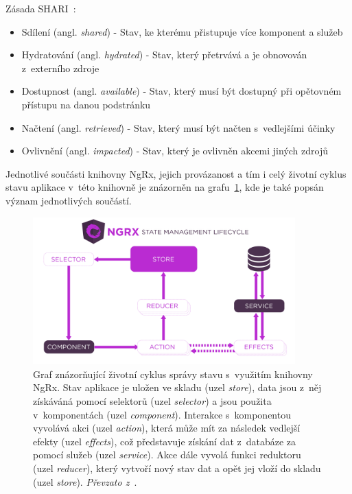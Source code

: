 Zásada SHARI~\cite{bib:ng-conf}:
\begin{itemize}
  \item Sdílení (angl. \emph{shared}) - Stav, ke kterému přistupuje více komponent a služeb
  \item Hydratování (angl. \emph{hydrated}) - Stav, který přetrvává a je obnovován z~externího zdroje
  \item Dostupnost (angl. \emph{available}) - Stav, který musí být dostupný při opětovném přístupu na danou podstránku
  \item Načtení (angl. \emph{retrieved}) - Stav, který musí být načten s~vedlejšími účinky
  \item Ovlivnění (angl. \emph{impacted}) - Stav, který je ovlivněn akcemi jiných zdrojů 
\end{itemize}

Jednotlivé součásti knihovny NgRx, jejich provázanost a tím i celý životní cyklus stavu aplikace v~této knihovně je znázorněn na grafu~\ref{img:ngrx-graph}, kde je také popsán význam jednotlivých součástí.

\begin{figure}[H]
	\centering
	\label{img:ngrx-graph}
	\includegraphics[width=0.9\textwidth]{obrazky-figures/ngrx-lifecycle.png}
	\caption{Graf znázorňující životní cyklus správy stavu s~využitím knihovny NgRx. Stav aplikace je uložen ve skladu (uzel \emph{store}), data jsou z~něj získáváná pomocí selektorů (uzel \emph{selector}) a jsou použita v~komponentách (uzel \emph{component}). Interakce s~komponentou vyvolává akci (uzel \emph{action}), která může mít za následek vedlejší efekty (uzel \emph{effects}), což představuje získání dat z~databáze za pomocí služeb (uzel \emph{service}). Akce dále vyvolá funkci reduktoru (uzel \emph{reducer}), který vytvoří nový stav dat a opět jej vloží do skladu (uzel \emph{store}).  \emph{Převzato z~\cite{bib:ngrx-lifecycle}}.}
\end{figure}

